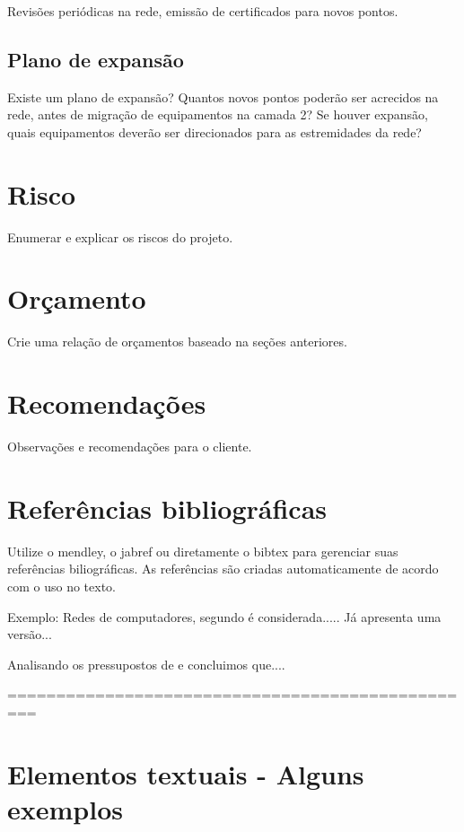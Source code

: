 \documentclass[	DIV=calc,%
paper=a4,%
fontsize=12pt,%
onecolumn]{scrartcl}	 					%
\begin{document}
	Revisões periódicas na rede, emissão de certificados para novos pontos.
	
	\subsection{Plano de expansão}
	Existe um plano de expansão? Quantos novos pontos poderão ser acrecidos na rede, antes de migração de equipamentos na camada 2? Se houver expansão, quais equipamentos deverão ser direcionados para as estremidades da rede? 
	
	\section{Risco}
	Enumerar e explicar os riscos do projeto.
	
	\section{Orçamento}
	Crie uma relação de orçamentos baseado na seções anteriores.
	
	\section{Recomendações}
	Observações e recomendações para o cliente.
	
	\section{Referências bibliográficas}
	Utilize o mendley, o jabref ou diretamente o bibtex para gerenciar suas referências biliográficas. As referências são criadas automaticamente de acordo com o uso no texto.
	
	Exemplo: Redes de computadores, segundo \cite{t2013} é considerada..... Já \cite{kurose2010} apresenta uma versão...
	
	Analisando os pressupostos de \cite{ref3} e \cite{ref4} concluimos que....
	
	
	\renewcommand\refname{} %
	
	  
	
	=================================================
	\section{Elementos textuais - Alguns exemplos}
	
\end{document}
